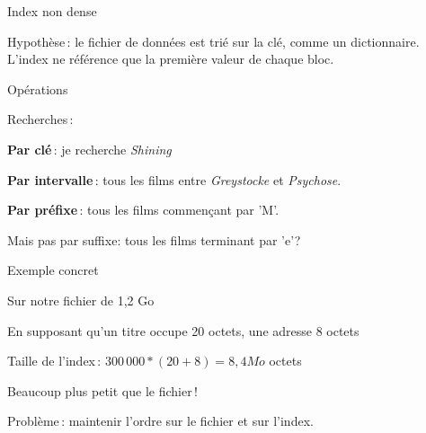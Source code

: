 \begin{frame}{Index non dense}



\vfill
\begin{blocgauche}
\alert{Hypothèse}\,: le fichier de données est \alert{trié sur la clé},
comme un dictionnaire. \alert{L'index ne référence que la première
valeur de chaque bloc}.
\end{blocgauche}
\end{frame}
\begin{frame}{Opérations}

Recherches\,:
\begin{redbullet}
  \item \textbf{Par clé}\,: je recherche \textit{Shining}
  \item \textbf{Par intervalle}\,: tous les films entre \textit{Greystocke}
    et \textit{Psychose}.

  \item \textbf{Par préfixe}\,: tous les films commençant par 'M'.
\end{redbullet}

\vfill
\begin{blocgauche}
\alert{Mais pas par suffixe}: tous les films terminant par 'e'?
\end{blocgauche}
\end{frame}
\begin{frame}{Exemple concret}

Sur notre fichier de 1,2 Go
\begin{redbullet}
  \item En supposant qu'un titre occupe 20 octets, une adresse 8 octets
   \item Taille de l'index\,: $300\,000 * (20 + 8)=8,4 Mo$ octets
\end{redbullet}

\vfill
\begin{blocgauche}
Beaucoup plus petit que le fichier\,!

\medskip

Problème\,: maintenir l'ordre sur le fichier \alert{et}
sur l'index.
\end{blocgauche}

\end{frame}
